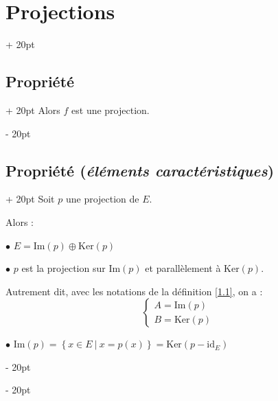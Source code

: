 \documentclass[a4paper, 12pt, twoside]{article}
\newcommand{\set}[1]{\left\{ #1 \right\}}
\newcommand{\ind}[1][20pt]{\advance\leftskip + #1}
\newcommand{\deind}[1][20pt]{\advance\leftskip - #1}
\newenvironment{indt}[2][20pt]{#2 \par \ind[#1]}{\par \deind} %
\begin{document}
\begin{indt}{\section{Projections}}
\begin{indt}{\subsection{Propriété}}
            Alors $f$ est une projection.
        \end{indt}

        \vspace{12pt}
        
        \begin{indt}{\subsection{Propriété (\textit{éléments caractéristiques})}}
            Soit $p$ une projection de $E$.

            Alors :

            $\bullet$ $E = \mathrm{Im}(p) \oplus \mathrm{Ker}(p)$

            $\bullet$ $p$ est la projection sur $\mathrm{Im}(p)$ et parallèlement à $\mathrm{Ker}(p)$.

            Autrement dit, avec les notations de la définition \ref{1.1}, on a :
            \[
                \begin{cases}
                    A = \mathrm{Im}(p)
                    \\
                    B = \mathrm{Ker}(p)
                \end{cases}
            \]

            $\bullet$ $\mathrm{Im}(p) = \set{x \in E\ |\ x = p(x)} = \mathrm{Ker}(p - \mathrm{id}_E)$
        \end{indt}
        
    \end{indt}

    \vspace{12pt}
    
\end{document}
